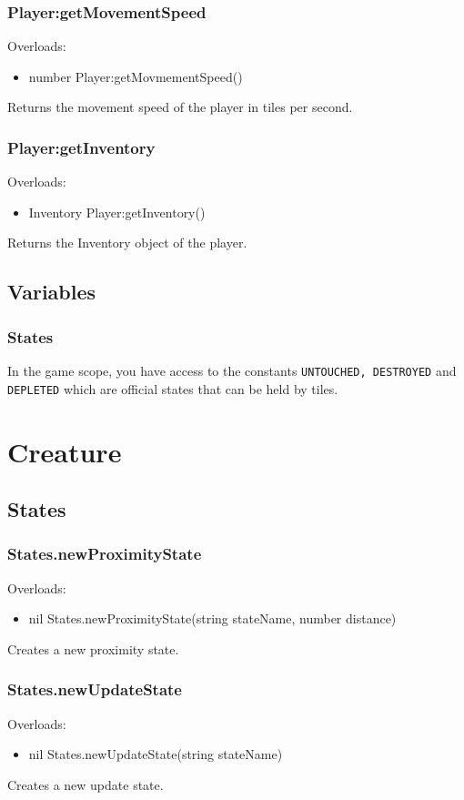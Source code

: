 \documentclass{book}
\newenvironment{ulist}
	{\begin{itemize}
			\itemsep0em}
	{\end{itemize}}
\begin{document}
\subsubsection{Player:getMovementSpeed}
Overloads:
\begin{ulist}
	\item number Player:getMovmementSpeed()
\end{ulist}
Returns the movement speed of the player in tiles per second.

\subsubsection{Player:getInventory}
Overloads:
\begin{ulist}
	\item Inventory Player:getInventory()
\end{ulist}
Returns the Inventory object of the player.


\subsection{Variables}
\subsubsection{States}
In the game scope, you have access to the constants \texttt{UNTOUCHED, DESTROYED} and \texttt{DEPLETED} which are official states that can be held by tiles.



\section{Creature}
\subsection{States}
\subsubsection{States.newProximityState}
Overloads:
\begin{ulist}
	\item nil States.newProximityState(string stateName, number distance)
\end{ulist}
Creates a new proximity state.

\subsubsection{States.newUpdateState}
Overloads:
\begin{ulist}
	\item nil States.newUpdateState(string stateName)
\end{ulist}
Creates a new update state.
\end{document}
